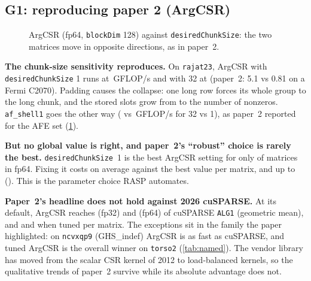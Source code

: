 \subsection{G1: reproducing paper 2 (ArgCSR)}\label{sec:eval-g1}

\begin{figure}[t]
\centering{}
\caption{ArgCSR (fp64, \texttt{blockDim} 128) against \texttt{desiredChunkSize}: the two matrices move in opposite
directions, as in paper~2.}\label{fig:chunk}
\end{figure}

\begin{table}[t]
\centering\small
\caption{Paper~2's named matrices (fp64, GFLOP/s): cuSPARSE \texttt{ALG1}, ArgCSR at the paper's default and tuned,
and the fastest configuration.}\label{tab:named}
\end{table}

\textbf{The chunk-size sensitivity reproduces.} On \texttt{rajat23}, ArgCSR with \texttt{desiredChunkSize} 1 runs at
\,GFLOP/s and with 32 at  (paper~2: 5.1 vs 0.81 on a Fermi C2070). Padding
causes the collapse: one long row forces its whole group to the long chunk, and the stored slots grow from
\x{} to \x{} the number of nonzeros. \texttt{af\_shell1} goes the other way
( vs \,GFLOP/s for 32 vs 1), as paper~2 reported for the AFE set
(\cref{fig:chunk}).

\textbf{But no global value is right, and paper~2's ``robust'' choice is rarely the best.} \texttt{desiredChunkSize}~1
is the best ArgCSR setting for only  of  matrices in fp64. Fixing it
costs \x{} on average against the best value per matrix, and up to \x{}
(\texttt{}). This is the parameter choice RASP automates.

\textbf{Paper~2's headline does not hold against 2026 cuSPARSE.} At its default, ArgCSR reaches
\x{} (fp32) and \x{} (fp64) of cuSPARSE \texttt{ALG1}
(geometric mean), and \x{} and \x{} when tuned per matrix. The
exceptions sit in the family the paper highlighted: on \texttt{ncvxqp9} (GHS\_indef) ArgCSR is
\x{} as fast as cuSPARSE, and tuned ArgCSR is the overall winner on \texttt{torso2}
(\cref{tab:named}). The vendor library has moved from the scalar CSR kernel of 2012 to load-balanced kernels, so the
qualitative trends of paper~2 survive while its absolute advantage does not.

